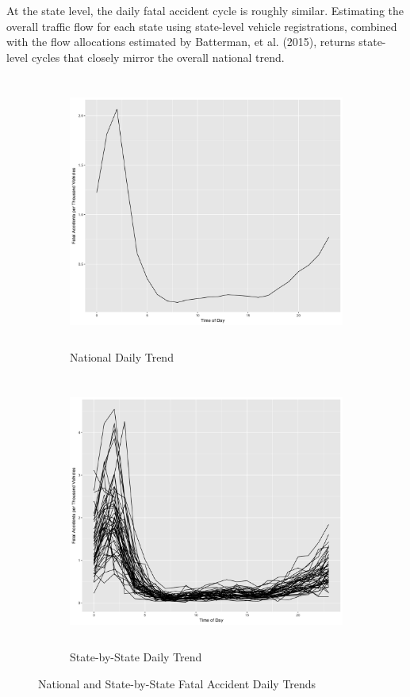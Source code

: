 \documentclass[11pt, oneside,titlepage]{article}   	%
\begin{document}
At the state level, the daily fatal accident cycle is roughly similar. Estimating the overall traffic flow for each state using state-level vehicle registrations, combined with the flow allocations estimated by Batterman, et al. (2015), returns state-level cycles that closely mirror the overall national trend.

\begin{figure}[H]
\centering
\begin{subfigure}{.5\textwidth}
	\centering
	\includegraphics[width=.9\textwidth,height=9cm,keepaspectratio]{WeightedNationalDayTrends.png}
	\caption{National Daily Trend}
	\label{fig:sub1}
\end{subfigure}%
\begin{subfigure}{.5\textwidth}
  \centering
	\includegraphics[width=.9\textwidth, height=9cm,keepaspectratio]{WeightedStatePlot.png}
	\caption{State-by-State Daily Trend}
  \label{fig:sub2}
\end{subfigure}
\caption{National and State-by-State Fatal Accident Daily Trends}
\label{fig:test}
\end{figure}
\end{document}
